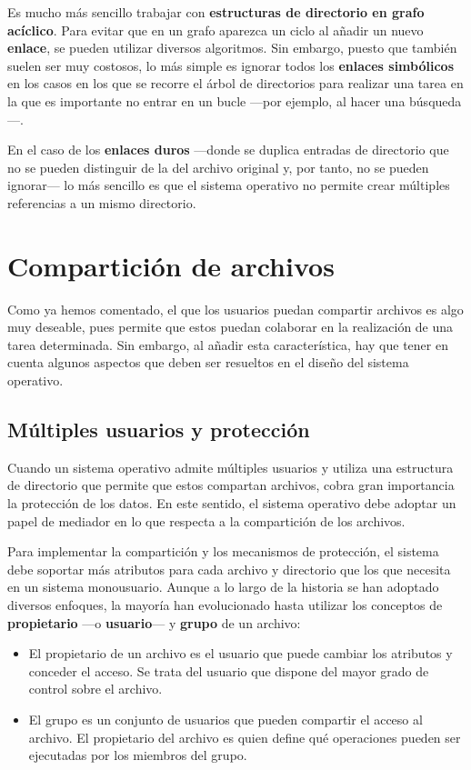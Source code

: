 Es mucho más sencillo trabajar con \textbf{estructuras de directorio en
grafo acíclico}. Para evitar que en un grafo aparezca un ciclo al añadir
un nuevo \textbf{enlace}, se pueden utilizar diversos algoritmos. Sin
embargo, puesto que también suelen ser muy costosos, lo más simple es
ignorar todos los \textbf{enlaces simbólicos} en los casos en los que se
recorre el árbol de directorios para realizar una tarea en la que es
importante no entrar en un bucle ---por ejemplo, al hacer una
búsqueda---.

En el caso de los \textbf{enlaces duros} ---donde se duplica entradas de
directorio que no se pueden distinguir de la del archivo original y, por
tanto, no se pueden ignorar--- lo más sencillo es que el sistema
operativo no permite crear múltiples referencias a un mismo directorio.

\section{Compartición de archivos}\label{_comparticiuxf3n_de_archivos}

Como ya hemos comentado, el que los usuarios puedan compartir archivos
es algo muy deseable, pues permite que estos puedan colaborar en la
realización de una tarea determinada. Sin embargo, al añadir esta
característica, hay que tener en cuenta algunos aspectos que deben ser
resueltos en el diseño del sistema operativo.

\subsection{Múltiples usuarios y
protección}\label{_muxfaltiples_usuarios_y_protecciuxf3n}

Cuando un sistema operativo admite múltiples usuarios y utiliza una
estructura de directorio que permite que estos compartan archivos, cobra
gran importancia la protección de los datos. En este sentido, el sistema
operativo debe adoptar un papel de mediador en lo que respecta a la
compartición de los archivos.

Para implementar la compartición y los mecanismos de protección, el
sistema debe soportar más atributos para cada archivo y directorio que
los que necesita en un sistema monousuario. Aunque a lo largo de la
historia se han adoptado diversos enfoques, la mayoría han evolucionado
hasta utilizar los conceptos de \textbf{propietario} ---o
\textbf{usuario}--- y \textbf{grupo} de un archivo:

\begin{itemize}
\item
  El propietario de un archivo es el usuario que puede cambiar los
  atributos y conceder el acceso. Se trata del usuario que dispone del
  mayor grado de control sobre el archivo.
\item
  El grupo es un conjunto de usuarios que pueden compartir el acceso al
  archivo. El propietario del archivo es quien define qué operaciones
  pueden ser ejecutadas por los miembros del grupo.
\end{itemize}


